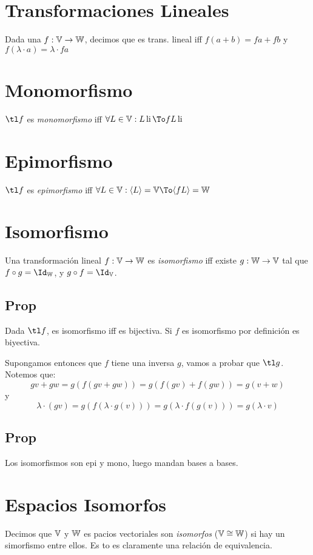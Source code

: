 \documentclass{article}
\begin{document}
\section{Transformaciones Lineales}
Dada una $f : \mathbb{V} \to \mathbb{W}$, decimos que es trans. lineal iff $f (a+b) = fa + fb$ y $f (\lambda \cdot a) = \lambda \cdot f a$

\section{Monomorfismo}
$\tl f$ es \emph{monomorfismo} iff $\forall L \in \V : L \li \To fL \li$

\section{Epimorfismo}
$\tl f$ es \emph{epimorfismo} iff $\forall L \in \V : \langle L\rangle = \V \To \langle fL\rangle = \W$

\section{Isomorfismo}
Una transformación lineal $f : \mathbb{V} \to \mathbb{W}$ es \emph{isomorfismo} iff existe $g : \mathbb{W} \to \mathbb{V}$
tal que $f \circ g = \Id_\W$, y $g \circ f = \Id_\V$.

\subsection{Prop}
Dada $\tl f$, es isomorfismo iff es bijectiva. Si $f$ es isomorfismo por definición es
biyectiva.

Supongamos entonces que $f$ tiene una inversa $g$, vamos a probar que $\tl g$.
Notemos que:
\[g v + g w = g (f (g v + gw))  = g (f(gv) + f(gw)) = g(v + w)\]
y
\[\lambda \cdot (g v) = g(f(\lambda \cdot g(v))) = g (\lambda \cdot f(g(v))) =
g (\lambda \cdot v)\]

\subsection{Prop}
Los isomorfismos son epi y mono, luego mandan bases a bases.

\section{Espacios Isomorfos}
Decimos que $\mathbb{V}$ y $\mathbb{W}$ es pacios vectoriales son \emph{isomorfos} ($\mathbb{V} \cong \mathbb{W}$)
si hay un simorfismo entre ellos. Es to es claramente una relación de equivalencia.
\end{document}
